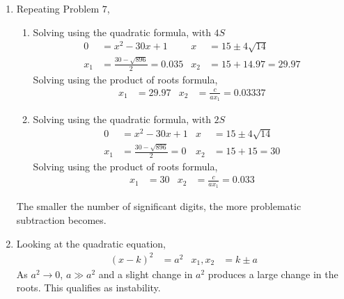 \begin{enumerate}
    \item Repeating Problem $ 7 $,
          \begin{enumerate}
              \item  Solving using the quadratic formula, with $ 4S $
                    \begin{align}
                        0   & = x^2 - 30x + 1                     &
                        x   & = 15 \pm 4 \sqrt{14}                  \\
                        x_1 & = \frac{30 - \sqrt{896}}{2} = 0.035 &
                        x_2 & = 15 + 14.97 = 29.97
                    \end{align}
                    Solving using the product of roots formula,
                    \begin{align}
                        x_1 & = 29.97 & x_2 & = \frac{c}{ax_1} = 0.03337
                    \end{align}

              \item  Solving using the quadratic formula, with $ 2S $
                    \begin{align}
                        0   & = x^2 - 30x + 1                 &
                        x   & = 15 \pm 4 \sqrt{14}              \\
                        x_1 & = \frac{30 - \sqrt{896}}{2} = 0 &
                        x_2 & = 15 + 15 = 30
                    \end{align}
                    Solving using the product of roots formula,
                    \begin{align}
                        x_1 & = 30 & x_2 & = \frac{c}{ax_1} = 0.033
                    \end{align}
          \end{enumerate}
          The smaller the number of significant digits, the more problematic subtraction
          becomes.

    \item Looking at the quadratic equation,
          \begin{align}
              (x-k)^2 & = a^2 & x_1, x_2 & = k \pm a
          \end{align}
          As $ a^2 \to 0 $, $ a \gg a^2 $ and a slight change in $ a^2 $ produces a
          large change in the roots. This qualifies as instability.


\end{enumerate}
